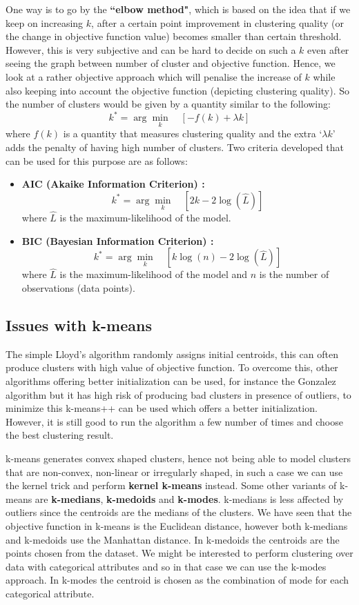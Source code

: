 \documentclass[12pt,a4paper]{article}
\begin{document}
One way is to go by the \textbf{``elbow method"}, which is based on the idea that if we keep on increasing $k$, after a certain point improvement in clustering quality (or the change in objective function value) becomes smaller than certain threshold. However, this is very subjective and can be hard to decide on such a $k$ even after seeing the graph between number of cluster and objective function. Hence, we look at a rather objective approach which will penalise the increase of $k$ while also keeping into account the objective function (depicting clustering quality). So the number of clusters would be given by a quantity similar to the following: $$k^* = \arg \min_k \quad [-f(k) + \lambda k]$$ where $f(k)$ is a quantity that measures clustering quality and the extra `$\lambda k$' adds the penalty of having high number of clusters. Two criteria developed that can be used for this purpose are as follows:
\begin{itemize}
    \item \textbf{AIC (Akaike Information Criterion) :} $$k^* = \arg \min_{k} \quad [2k - 2 \log{(\hat{L})}]$$ where $\hat{L}$ is the maximum-likelihood of the model.
    \item  \textbf{BIC (Bayesian Information Criterion) :} $$k^* = \arg \min_{k} \quad [k \log(n) - 2\log{(\hat{L})}]$$ where $\hat{L}$ is the maximum-likelihood of the model and $n$ is the number of observations (data points).
\end{itemize}

\subsection{Issues with k-means}

The simple Lloyd's algorithm randomly assigns initial centroids, this can often produce clusters with high value of objective function. To overcome this, other algorithms offering better initialization can be used, for instance the Gonzalez algorithm but it has high risk of producing bad clusters in presence of outliers, to minimize this k-means++ can be used which offers a better initialization. However, it is still good to run the algorithm a few number of times and choose the best clustering result.

k-means generates convex shaped clusters, hence not being able to model clusters that are non-convex, non-linear or irregularly shaped, in such a case we can use the kernel trick and perform \textbf{kernel k-means} instead. Some other variants of k-means are \textbf{k-medians}, \textbf{k-medoids} and \textbf{k-modes}. k-medians is less affected by outliers since the centroids are the medians of the clusters. We have seen that the objective function in k-means is the Euclidean distance, however both k-medians and k-medoids use the Manhattan distance. In k-medoids the centroids are the points chosen from the dataset. We might be interested to perform clustering over data with categorical attributes and so in that case we can use the k-modes approach. In k-modes the centroid is chosen as the combination of mode for each categorical attribute.
\end{document}
